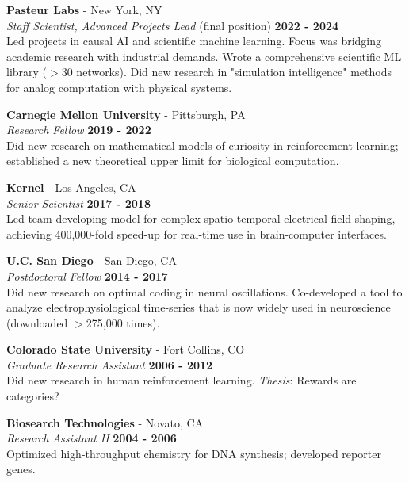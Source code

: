 \documentclass[margin,line]{res}
\begin{document}
\begin{resume}
\vspace{-.25cm}
{\bf Pasteur Labs} - New York, NY\\
{\em Staff Scientist, Advanced Projects Lead} (final position) \hfill {\bf 2022 - 2024}\\
Led projects in causal AI and scientific machine learning. Focus was bridging academic research with industrial demands. Wrote a comprehensive scientific ML library ($>$30 networks). Did new research in  "simulation intelligence" methods for analog computation with physical systems.


\vspace{-.25cm}
{\bf Carnegie Mellon University} - Pittsburgh, PA\\
{\em Research Fellow} \hfill {\bf 2019 - 2022}\\
Did new research on mathematical models of curiosity in reinforcement learning; established a new theoretical upper limit for biological computation.

\vspace{-.25cm}
{\bf Kernel} - Los Angeles, CA\\
{\em Senior Scientist} \hfill {\bf 2017 - 2018}\\
Led team developing model for complex spatio-temporal electrical field shaping, achieving 400,000-fold speed-up for real-time use in brain-computer interfaces.

\vspace{-.25cm}
{\bf U.C. San Diego} - San Diego, CA\\
{\em Postdoctoral Fellow} \hfill {\bf 2014 - 2017}\\
Did new research on optimal coding in neural oscillations. Co-developed a tool to analyze electrophysiological time-series that is now widely used in neuroscience (downloaded $>$275,000 times).

\vspace{-.25cm}
{\bf Colorado State University} - Fort Collins, CO\\
{\em Graduate Research Assistant} \hfill {\bf 2006 - 2012}\\
Did new research in human reinforcement learning. \emph{Thesis}: Rewards are categories?

\vspace{-.25cm}
{\bf Biosearch Technologies} - Novato, CA\\
{\em Research Assistant II} \hfill {\bf 2004 - 2006}\\
Optimized high-throughput chemistry for DNA synthesis; developed reporter genes.


\end{resume}
\end{document}
